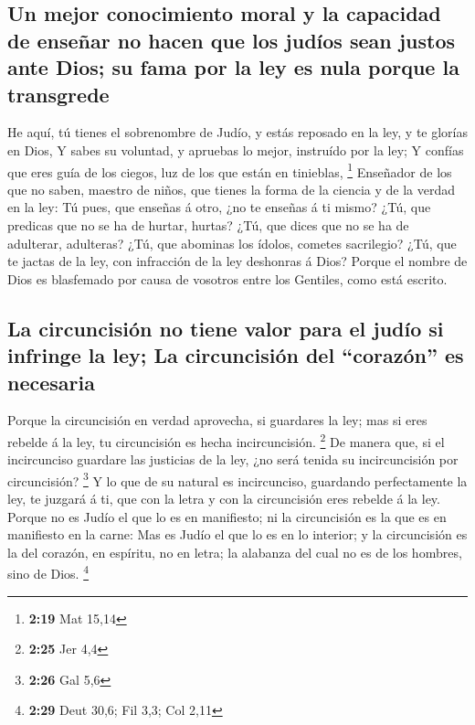 \hypertarget{un-mejor-conocimiento-moral-y-la-capacidad-de-enseuxf1ar-no-hacen-que-los-juduxedos-sean-justos-ante-dios-su-fama-por-la-ley-es-nula-porque-la-transgrede}{%
\subsection{Un mejor conocimiento moral y la capacidad de enseñar no
hacen que los judíos sean justos ante Dios; su fama por la ley es nula
porque la
transgrede}\label{un-mejor-conocimiento-moral-y-la-capacidad-de-enseuxf1ar-no-hacen-que-los-juduxedos-sean-justos-ante-dios-su-fama-por-la-ley-es-nula-porque-la-transgrede}}

 He aquí, tú tienes el sobrenombre de Judío, y estás
reposado en la ley, y te glorías en Dios,  Y sabes su
voluntad, y apruebas lo mejor, instruído por la ley;  Y
confías que eres guía de los ciegos, luz de los que están en tinieblas,
\footnote{\textbf{2:19} Mat 15,14}  Enseñador de los que no
saben, maestro de niños, que tienes la forma de la ciencia y de la
verdad en la ley:  Tú pues, que enseñas á otro, ¿no te
enseñas á ti mismo? ¿Tú, que predicas que no se ha de hurtar, hurtas?
 ¿Tú, que dices que no se ha de adulterar, adulteras? ¿Tú,
que abominas los ídolos, cometes sacrilegio?  ¿Tú, que te
jactas de la ley, con infracción de la ley deshonras á Dios?
 Porque el nombre de Dios es blasfemado por causa de
vosotros entre los Gentiles, como está escrito.

\hypertarget{la-circuncisiuxf3n-no-tiene-valor-para-el-juduxedo-si-infringe-la-ley-la-circuncisiuxf3n-del-corazuxf3n-es-necesaria}{%
\subsection{La circuncisión no tiene valor para el judío si infringe la
ley; La circuncisión del ``corazón'' es
necesaria}\label{la-circuncisiuxf3n-no-tiene-valor-para-el-juduxedo-si-infringe-la-ley-la-circuncisiuxf3n-del-corazuxf3n-es-necesaria}}

 Porque la circuncisión en verdad aprovecha, si guardares
la ley; mas si eres rebelde á la ley, tu circuncisión es hecha
incircuncisión. \footnote{\textbf{2:25} Jer 4,4}  De manera
que, si el incircunciso guardare las justicias de la ley, ¿no será
tenida su incircuncisión por circuncisión? \footnote{\textbf{2:26} Gal
  5,6}  Y lo que de su natural es incircunciso, guardando
perfectamente la ley, te juzgará á ti, que con la letra y con la
circuncisión eres rebelde á la ley.  Porque no es Judío el
que lo es en manifiesto; ni la circuncisión es la que es en manifiesto
en la carne:  Mas es Judío el que lo es en lo interior; y
la circuncisión es la del corazón, en espíritu, no en letra; la alabanza
del cual no es de los hombres, sino de Dios. \footnote{\textbf{2:29}
  Deut 30,6; Fil 3,3; Col 2,11}


